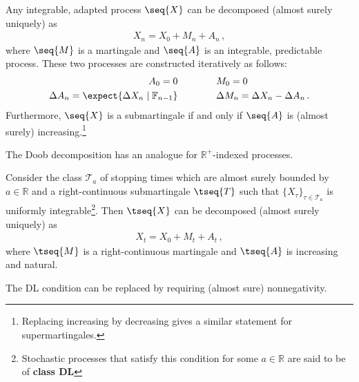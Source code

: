     \begin{theorem}
        Any integrable, adapted process $\seq{X}$ can be decomposed (almost surely uniquely) as
        \begin{gather}
            X_n=X_0+M_n+A_n\,,
        \end{gather}
        where $\seq{M}$ is a martingale and $\seq{A}$ is an integrable, predictable process. These two processes are constructed iteratively as follows:
        \begin{gather}
            \begin{aligned}
                A_0 = 0\qquad&\qquad M_0 = 0\\
                \Delta A_n = \expect{\Delta X_n\mid\mathbb{F}_{n-1}}\qquad&\qquad\Delta M_n = \Delta X_n - \Delta A_n\,.
            \end{aligned}
        \end{gather}
        Furthermore, $\seq{X}$ is a submartingale if and only if $\seq{A}$ is (almost surely) increasing.\footnote{Replacing increasing by decreasing gives a similar statement for supermartingales.}
    \end{theorem}

    The Doob decomposition has an analogue for $\mathbb{R}^+$-indexed processes.
    \begin{theorem}
        Consider the class $\mathcal{T}_{\!\!a}$ of stopping times which are almost surely bounded by $a\in\mathbb{R}$ and a right-continuous submartingale $\tseq{T}$ such that $\{X_\tau\}_{\tau\in\mathcal{T}_{\!\!a}}$ is uniformly integrable\footnote{Stochastic processes that satisfy this condition for some $a\in\mathbb{R}$ are said to be of \textbf{class DL}}. Then $\tseq{X}$ can be decomposed (almost surely uniquely) as
        \begin{gather}
            X_t = X_0 + M_t + A_t\,,
        \end{gather}
        where $\tseq{M}$ is a right-continuous martingale and $\tseq{A}$ is increasing and natural.
    \end{theorem}
    \begin{remark}
        The DL condition can be replaced by requiring (almost sure) nonnegativity.
    \end{remark}

